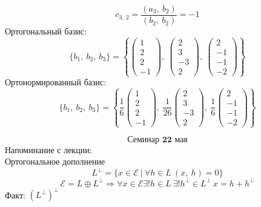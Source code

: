 \documentclass[12pt, letterpaper, twoside]{article}
\begin{document}
        \[c_{3,\ 2} = \frac{(a_3,\ b_2)}{(b_2,\ b_2)} = -1\]
        Ортогональный базис:
        \[\{b_1,\ b_2,\ b_3\} = \left\{\begin{pmatrix}
            1\\2\\2\\-1
        \end{pmatrix},\ \begin{pmatrix}
            2\\3\\-3\\2
        \end{pmatrix},\ \begin{pmatrix}
            2\\-1\\-1\\-2
        \end{pmatrix}\right\}\]
        Ортонормированный базис:
        \[\{b_1,\ b_2,\ b_3\} = \left\{\frac{1}{6}\begin{pmatrix}
            1\\2\\2\\-1
        \end{pmatrix},\ \frac{1}{26}\begin{pmatrix}
            2\\3\\-3\\2
        \end{pmatrix},\ \frac{1}{6}\begin{pmatrix}
            2\\-1\\-1\\-2
        \end{pmatrix}\right\}\]
    
\[\textbf{Семинар 22 мая}\]
Напоминание с лекции:\\
Ортогональное дополнение
\[L^{\bot} = \big\{ x\in \mathcal{E} \ \big|\ \forall h\in L\ (x,\ h) = 0 \big\}\]
\[\mathcal{E} = L\oplus L^{\bot}\Rightarrow \forall x\in \mathcal{E}\exists! h\in L\ \exists! h^{\bot} \in L^{\bot}\ x = h + h^{\bot}\]
Факт: $\left( L^{\bot} \right)^{\bot}$
\end{document}
